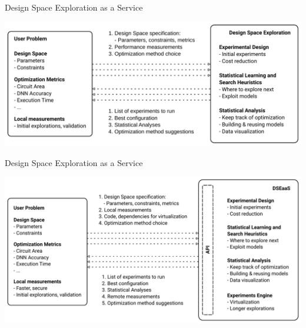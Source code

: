 \documentclass[10pt, compress, aspectratio=169, xcolor={table,usenames,dvipsnames}]{beamer}
\begin{document}
\begin{frame}[label={sec:orgf84c4b3}]{Design Space Exploration as a Service}
\begin{center}
\includegraphics[width=\columnwidth]{../../../img/dse_summary.pdf}
\end{center}
\end{frame}
\begin{frame}[label={sec:org371aae9}]{Design Space Exploration as a Service}
\begin{center}
\includegraphics[width=\columnwidth]{../../../img/dseaas_test.pdf}
\end{center}
\end{frame}
\end{document}
